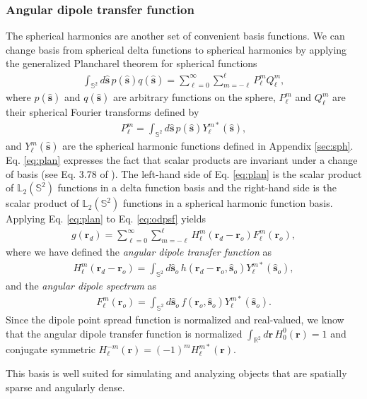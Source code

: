 \documentclass[]{osa-article}
\providecommand{\mb}[1]{\mathbf{#1}}
\providecommand{\ro}{\mathbf{\mathbf{r}}_o}
\providecommand{\so}{\mathbf{\hat{s}}_o}
\providecommand{\rd}{\mathbf{r}_d}
\providecommand{\mh}[1]{\mathbf{\hat{#1}}}
\providecommand{\mbb}[1]{\mathbb{#1}}
\providecommand{\lmsum}{\sum_{\ell=0}^\infty\sum_{m=-\ell}^{\ell}}
\providecommand{\ints}[1]{\int_{\mbb{S}^{#1}}}
\begin{document}
\subsubsection{Angular dipole transfer function}
The spherical harmonics are another set of convenient basis functions. We can
change basis from spherical delta functions to spherical harmonics by applying
the generalized Plancharel theorem for spherical functions
\begin{align}
  \ints{2}d\mh{s}\, p(\mh{s})q(\mh{s}) = \lmsum P_\ell^m Q_\ell^m, \label{eq:plan}
\end{align}
where $p(\mh{s})$ and $q(\mh{s})$ are arbitrary functions on the sphere, $P_\ell^m$ and $Q_\ell^m$ are their spherical Fourier transforms defined by
\begin{align}
  P_\ell^m = \int_{\mbb{S}^2}d\mh{s}\, p(\mh{s})Y_\ell^{m*}(\mh{s}),
\end{align}
and $Y_{\ell}^m(\mh{s})$ are the spherical harmonic functions defined in
Appendix \ref{sec:sph}. Eq. \ref{eq:plan} expresses the fact that scalar
products are invariant under a change of basis (see Eq. 3.78 of
\cite{barrett2004}). The left-hand side of Eq. \ref{eq:plan} is the scalar
product of $\mbb{L}_2(\mbb{S}^2)$ functions in a delta function basis and the
right-hand side is the scalar product of $\mbb{L}_2(\mbb{S}^2)$ functions in a
spherical harmonic function basis. Applying Eq. \ref{eq:plan} to Eq.
\ref{eq:odpsf} yields
\begin{align}
  g(\rd) = \lmsum H_\ell^m(\rd - \ro)F_\ell^m(\ro), \label{eq:atf-form}
\end{align}
where we have defined the \textit{angular dipole transfer function} as
\begin{align}
  H_\ell^m(\rd - \ro) = \int_{\mbb{S}^2}d\so\, h(\rd - \ro, \so)Y_{\ell}^{m*}(\so),\label{eq:atf-prep} 
\end{align}
and the \textit{angular dipole spectrum} as
\begin{align}
  F_\ell^m(\ro) = \int_{\mbb{S}^2}d\so\, f(\ro, \so)Y_{\ell}^{m*}(\so).
\end{align}
Since the dipole point spread function is normalized and real-valued, we know
that the angular dipole transfer function is normalized
$\int_{\mbb{R}^2}d\mb{r}\, H_0^0(\mb{r}) = 1$ and conjugate symmetric
$H_\ell^{-m}(\mb{r}) = (-1)^mH_\ell^{m*}(\mb{r})$.

This basis is well suited for simulating and analyzing objects that are
spatially sparse and angularly dense.
\end{document}
